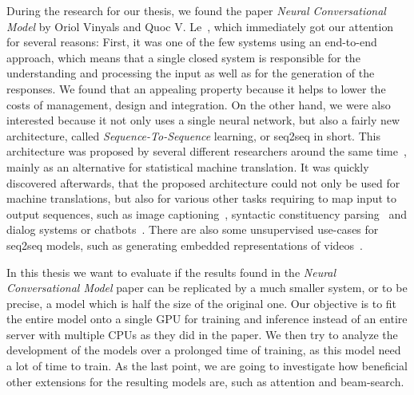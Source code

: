 During the research for our thesis, we found the paper \emph{Neural Conversational Model} by Oriol Vinyals and Quoc V. Le~\cite{Vinyals:2015}, which immediately got our attention for several reasons: First, it was one of the few systems using an end-to-end approach, which means that a single closed system is responsible for the understanding and processing the input as well as for the generation of the responses. We found that an appealing property because it helps to lower the costs of management, design and integration. On the other hand, we were also interested because it not only uses a single neural network, but also a fairly new architecture, called \emph{Sequence-To-Sequence} learning, or seq2seq in short. This architecture was proposed by several different researchers around the same time~\cite{Sutskever:2014}\cite{Kalchbrenner:2013}\cite{Cho:2014}, mainly as an alternative for statistical machine translation. It was quickly discovered afterwards, that the proposed architecture could not only be used for machine translations, but also for various other tasks requiring to map input to output sequences, such as image captioning~\cite{Xu:2015}, syntactic constituency parsing~\cite{Vinyals:2015:Foreign} and dialog systems or chatbots~\cite{Zivkovic:Trumpbot}\cite{Lison:2016}. There are also some unsupervised use-cases for seq2seq models, such as generating embedded representations of videos~\cite{Nitish:2015}.

In this thesis we want to evaluate if the results found in the \emph{Neural Conversational Model} paper can be replicated by a much smaller system, or to be precise, a model which is half the size of the original one. Our objective is to fit the entire model onto a single GPU for training and inference instead of  an entire server with multiple CPUs as they did in the paper. We then try to analyze the development of the models over a prolonged time of training, as this model need a lot of time to train. As the last point, we are going to investigate how beneficial other extensions for the resulting models are, such as attention and beam-search.